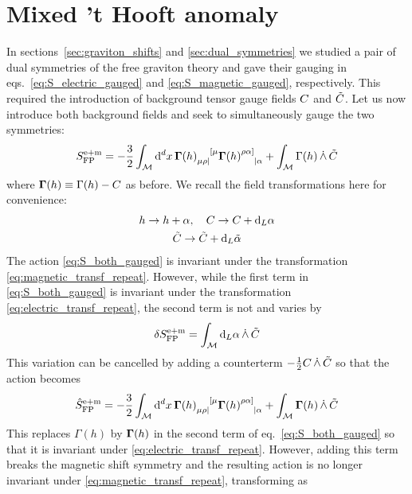 \section{Mixed 't Hooft anomaly}
\label{sec:anomalies}

In sections~\ref{sec:graviton_shifts} and \ref{sec:dual_symmetries} we studied a pair of dual symmetries of the free graviton theory and gave their gauging in eqs.~\eqref{eq:S_electric_gauged} and \eqref{eq:S_magnetic_gauged}, respectively. This required the introduction of background tensor gauge fields $C$ and $\tilde{C}$. Let us now introduce both background fields and seek to simultaneously gauge the two symmetries:
\begin{equation}\label{eq:S_both_gauged}
    S_{\text{FP}}^{\text{e}+\text{m}} = -\frac{3}{2} \int_{\mathcal{M}} \dd[d]{x} \ggamma(h)\indices{_{\mu\rho|}^{[\mu}} \ggamma(h)\indices{^{\rho\alpha]}_{|\alpha}} + \int_{\mathcal{M}} \Gamma(h) \,\wedgedot\, \gaugefieldtilde
\end{equation}
where $\mathbf{\Gamma}(h) \equiv \Gamma(h) - C$ as before. We recall the field transformations here for convenience:
\begin{gather}
    h \to h + \alpha \qc \gaugefield \to \gaugefield + \dd_L \alpha \label{eq:electric_transf_repeat} \\
    \gaugefieldtilde \to \gaugefieldtilde + \dd_L \tilde{\alpha} \label{eq:magnetic_transf_repeat}
\end{gather}
The action \eqref{eq:S_both_gauged} is invariant under the transformation \eqref{eq:magnetic_transf_repeat}. However, while the first term in \eqref{eq:S_both_gauged} is invariant under the transformation \eqref{eq:electric_transf_repeat}, the second term is not and varies by
\begin{equation}\label{eq:anomaly}
    \delta S_{\text{FP}}^{\text{e}+\text{m}} = \int_{\mathcal{M}} \dd_L \alpha \,\dot{\wedge}\, \tilde{C}
\end{equation}
This variation can be cancelled by adding a counterterm $-\frac{1}{2} C \,\dot{\wedge}\, \tilde{C}$ so that the action becomes
\begin{equation}\label{eq:S_both_gaugedplus}
     \hat S_{\text{FP}}^{\text{e}+\text{m}} = -\frac{3}{2} \int_{\mathcal{M}} \dd[d]{x} \ggamma(h)\indices{_{\mu\rho|}^{[\mu}} \ggamma(h)\indices{^{\rho\alpha]}_{|\alpha}} + \int_{\mathcal{M}} \ggamma(h) \,\wedgedot\, \gaugefieldtilde
\end{equation}
This replaces $\Gamma(h)$ by $\mathbf{\Gamma}(h)$ in the second term of eq.~\eqref{eq:S_both_gauged} so that it is invariant under \eqref{eq:electric_transf_repeat}. However, adding this term breaks the magnetic shift symmetry and the resulting action is no longer invariant under \eqref{eq:magnetic_transf_repeat}, transforming as
